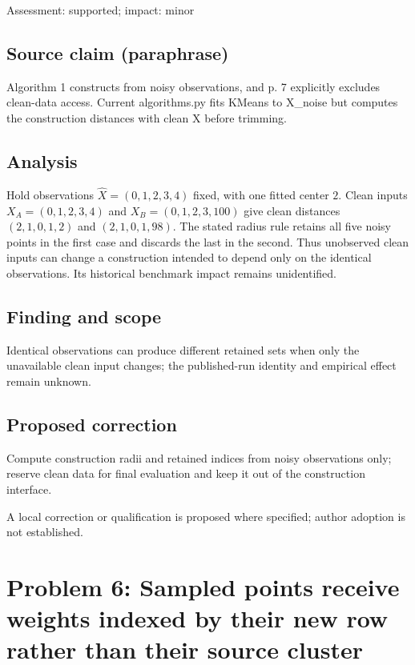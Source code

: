 \documentclass[11pt]{article}
\begin{document}
Assessment: supported; impact: minor

\subsection*{Source claim (paraphrase)}

Algorithm 1 constructs from noisy observations, and p. 7 explicitly excludes clean-data access. Current algorithms.py fits KMeans to X\_noise but computes the construction distances with clean X before trimming.

\subsection*{Analysis}

Hold observations \(\widehat X=(0,1,2,3,4)\) fixed, with one fitted center \(2\). Clean inputs \(X_A=(0,1,2,3,4)\) and \(X_B=(0,1,2,3,100)\) give clean distances \((2,1,0,1,2)\) and \((2,1,0,1,98)\). The stated radius rule retains all five noisy points in the first case and discards the last in the second. Thus unobserved clean inputs can change a construction intended to depend only on the identical observations. Its historical benchmark impact remains unidentified.

\subsection*{Finding and scope}

Identical observations can produce different retained sets when only the unavailable clean input changes; the published-run identity and empirical effect remain unknown.

\subsection*{Proposed correction}

Compute construction radii and retained indices from noisy observations only; reserve clean data for final evaluation and keep it out of the construction interface.

A local correction or qualification is proposed where specified; author adoption is not established.

\section*{Problem 6: Sampled points receive weights indexed by their new row rather than their source cluster}
\end{document}

